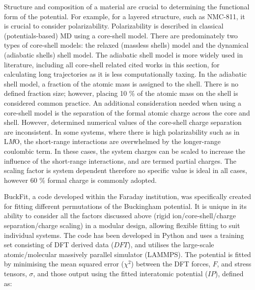 \documentclass[../main.tex]{subfiles}
\begin{document}
Structure and composition of a material are crucial to determining the functional form of the potential. For example, for a layered structure, such as NMC-811, it is crucial to consider polarizability. Polarizability is described in classical (potentials-based) MD using a core-shell model. There are predominately two types of core-shell models: the relaxed (massless shells) model \cite{Lindan_1993} and the dynamical (adiabatic shells) shell model. \cite{Mitchell_1993} The adiabatic shell model is more widely used in literature, including all core-shell related cited works in this section,\cite{Hart1998, Fisher2010, Lewis_1985,Ammundsen1999, Kerisit2014, he2019thermal,lee2012atomistic} for calculating long trajectories as it is less computationally taxing. In the adiabatic shell model, a fraction of the atomic mass is assigned to the shell. There is no defined fraction size; however, placing 10 \% of the atomic mass on the shell is considered common practice. \cite{PLIMPTON19951,todorov2006dl_poly_3} An additional consideration needed when using a core-shell model is the separation of the formal atomic charge across the core and shell. However, determined numerical values of the core-shell charge separation are inconsistent. \cite{wang2014molecular,escribano2017enhancing, lee2012atomistic,Lee2013_lithium,dai2019comparison} In some systems, where there is high polarizability such as in L\textit{M}O, the short-range interactions are overwhelmed by the longer-range coulombic term. In these cases, the system charges can be scaled to increase the influence of the short-range interactions, and are termed partial charges. The scaling factor is system dependent therefore no specific value is ideal in all cases, however 60 \% formal charge is commonly adopted. \cite{pedone2006potentials}

BuckFit, \cite{Morgan2020BuckFit} a code developed within the Faraday institution, was specifically created for fitting different permutations of the Buckingham potential. It is unique in its ability to consider all the factors discussed above (rigid ion/core-shell/charge separation/charge scaling) in a modular design, allowing flexible fitting to suit individual systems. The code has been developed in Python and uses a training set consisting of DFT derived data ($DFT$), and utilises the large-scale atomic/molecular massively parallel simulator (LAMMPS). \cite{PLIMPTON19951} The potential is fitted by minimising the mean squared error ($\chi^2$) between the DFT forces, $F$, and stress tensors, $\sigma$,  and those output using the fitted interatomic potential ($IP$), defined as:
\end{document}
